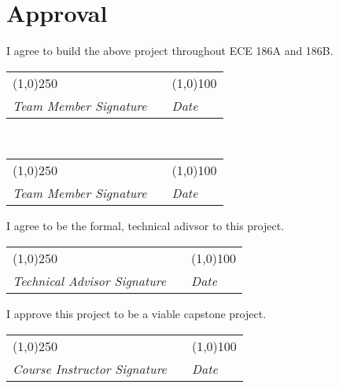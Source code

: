  
		 
		 
		 
		 
		 
		 
	 \newpage
	 \section{Approval}
		\begin{flushleft}
			I agree to build the above project throughout ECE 186A and 186B.\\
			\vspace{2em}
			\begin{tabular}{l l l}
				\line(1,0){250} & \hfill & \line(1,0){100}\\
				\textit{Team Member Signature} & & \textit{Date}				
			\end{tabular}
			\vspace{2em}\\
			\begin{tabular}{l l l}
				\line(1,0){250} & \hfill & \line(1,0){100}\\
				\textit{Team Member Signature} & & \textit{Date}
			\end{tabular}
			\vspace{5em}
			
			I agree to be the formal, technical adivsor to this project.\\
			\vspace{2em}
			\begin{tabular}{l l l}
				\line(1,0){250} & \hfill & \line(1,0){100}\\
				\textit{Technical Advisor Signature} & & \textit{Date}
			\end{tabular}
			\vspace{5em}
			
			I approve this project to be a viable capstone project.\\
			\vspace{2em}
			\begin{tabular}{l l l}
				\line(1,0){250} & \hfill & \line(1,0){100}\\
				\textit{Course Instructor Signature} & & \textit{Date}
			\end{tabular}
		\end{flushleft}		 
		 
